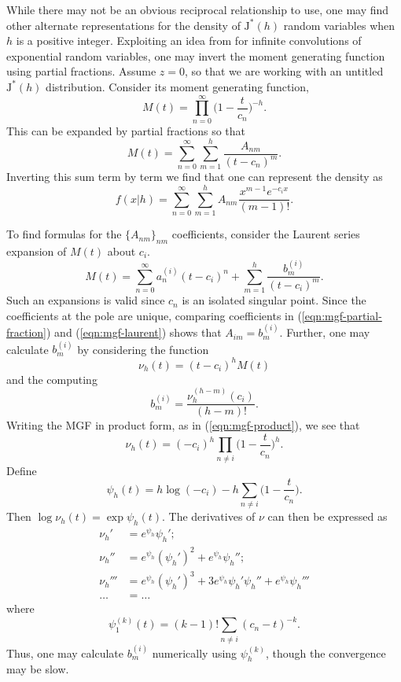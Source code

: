 \documentclass[12pt]{article}
\newcommand{\JJ}{\text{J}^*}
\begin{document}
While there may not be an obvious reciprocal relationship to use, one may find
other alternate representations for the density of $\JJ(h)$ random variables
when $h$ is a positive integer.  Exploiting an idea from \cite{kent-1980} for
infinite convolutions of exponential random variables, one may invert the moment
generating function using partial fractions.  Assume $z=0$, so that we are
working with an untitled $\JJ(h)$ distribution.  Consider its moment generating
function,
\begin{equation}
\label{eqn:mgf-product}
M(t) = \prod_{n=0}^\infty \Big(1 - \frac{t}{c_n}\Big)^{-h}.
\end{equation}
This can be expanded by partial fractions so that
\begin{equation}
\label{eqn:mgf-partial-fraction}
M(t) = \sum_{n=0}^\infty \sum_{m=1}^h \frac{A_{nm}}{(t - c_n)^m}.
\end{equation}
Inverting this sum term by term we find that one can represent the density as
\[
f(x|h) = \sum_{n=0}^\infty \sum_{m=1}^h A_{nm} \frac{x^{m-1} e^{-c_i x}}{(m-1)!}.
\]

To find formulas for the $\{A_{nm}\}_{nm}$ coefficients, consider the Laurent
series expansion of $M(t)$ about $c_i$.
\begin{equation}
\label{eqn:mgf-laurent}
M(t) = \sum_{n=0}^\infty a_{n}^{(i)} (t - c_i)^n + \sum_{m=1}^h
\frac{b_m^{(i)}}{(t - c_i)^m}.
\end{equation}
Such an expansions is valid since $c_n$ is an isolated singular point.  Since
the coefficients at the pole are unique, comparing coefficients in
(\ref{eqn:mgf-partial-fraction}) and (\ref{eqn:mgf-laurent}) shows that $A_{im}
= b_m^{(i)}$.  Further, one may calculate $b_m^{(i)}$ by considering the
function
\[
\nu_h(t) = (t - c_i)^h M(t)
\]
and the computing
\[
b_m^{(i)} = \frac{\nu_h^{(h-m)}(c_i)}{(h-m)!}.
\]
Writing the MGF in product form, as in (\ref{eqn:mgf-product}), we see that
\[
\nu_h(t) = (-c_i)^h \prod_{n \neq i} \Big(1 - \frac{t}{c_n} \Big)^h.
\]
Define
\[
\psi_h(t) = h \log (-c_i) - h \sum_{n \neq i} \Big(1 - \frac{t}{c_n}\Big).
\]
Then $\log \nu_h(t) = \exp \psi_h(t)$.  The
derivatives of $\nu$ can then be expressed as
\begin{align*}
\nu_h' & = e^{\psi_h} \psi_h'; \\
\nu_h'' & = e^{\psi_h} (\psi_h')^2 + e^{\psi_h} \psi_h''; \\
\nu_h''' & = e^{\psi_h} (\psi_h')^3 + 3 e^{\psi_h} \psi_h' \psi_h'' + e^{\psi_h}
\psi_h''' \\
\ldots & = \ldots \; \; 
\end{align*}
where
\[
\psi_1^{(k)}(t) = (k-1)! \sum_{n \neq i} ( c_n - t )^{-k}.
\]
Thus, one may calculate $b_{m}^{(i)}$ numerically using $\psi_h^{(k)}$, though
the convergence may be slow.
\end{document}
